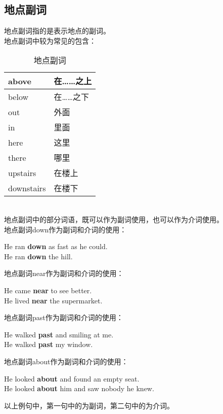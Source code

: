 \documentclass[UTF8]{ctexart}
\newcommand{\littf}[1]{{\hspace{3pt}\ttfamily #1}}
\begin{document}
\newpage

\subsection{地点副词}
    地点副词指的是表示地点的副词。\\[3mm]
    地点副词中较为常见的包含：
    \begin{table}[h]
        \begin{center}
            \ttfamily
            \begin{tabular}{p{80pt}|p{100pt}}
                \hline
                above&在……之上\\ \hline
                below&在……之下\\ \hline
                out&外面\\ \hline
                in&里面\\ \hline
                here&这里\\ \hline
                there&哪里\\ \hline
                upstairs&在楼上\\ \hline
                downstairs&在楼下\\ \hline
            \end{tabular}
            \rmfamily
            \caption{地点副词}
        \end{center}
    \end{table}\\
    地点副词中的部分词语，既可以作为副词使用，也可以作为介词使用。\\[3mm]
    地点副词\littf{down}作为副词和介词的使用：
    \begin{center}
        \large\ttfamily
        He ran \textbf{down} as fast as he could.\\[3mm]
        He ran \textbf{down} the hill.\\[6mm]
    \end{center}
    地点副词\littf{near}作为副词和介词的使用：
    \begin{center}
        \large\ttfamily 
        He came \textbf{near} to see better.\\[3mm]
        He lived \textbf{near} the supermarket.\\[6mm]
    \end{center}
    地点副词\littf{past}作为副词和介词的使用：
    \begin{center}
        \large\ttfamily
        He walked \textbf{past} and smiling at me.\\[3mm]
        He walked \textbf{past} my window.\\[6mm]
    \end{center}
    地点副词\littf{about}作为副词和介词的使用：
    \begin{center}
        \large\ttfamily
        He looked \textbf{about} and found an empty seat.\\[3mm]
        He looked \textbf{about} him and saw nobody he knew.\\[6mm]
    \end{center}
    以上例句中，第一句中的为副词，第二句中的为介词。
    
\end{document}

